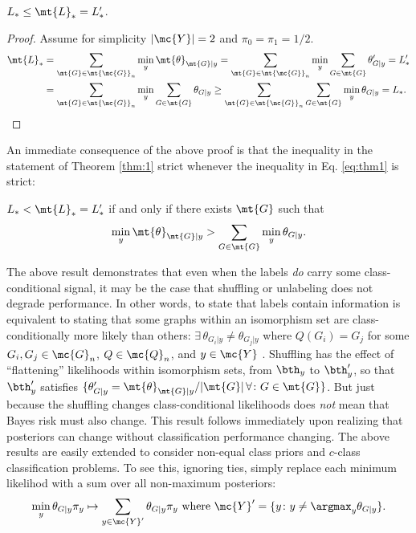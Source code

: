 \documentclass[10pt,journal,cspaper,compsoc]{IEEEtran}
\newcommand{\Qs}{Q}
\begin{document}
\begin{thm} \label{thm:1}
$L_* \leq \mt{L}_*=L_*'$.
\end{thm}

\begin{proof}
	Assume for simplicity $|\mc{Y}|=2$ and $\pi_0=\pi_1=1/2$.  
\begin{align} \label{eq:thm1}
	\mt{L}_*&=\sum_{\mt{G} \in \mt{\mc{G}}_n} \min_y  \mt{\theta}_{\mt{G}|y}  
	=\sum_{\mt{G} \in \mt{\mc{G}}_n} \min_y  \sum_{G \in \mt{G}}\theta_{G|y}'  = L_*' \nonumber \\
	&=\sum_{\mt{G} \in \mt{\mc{G}}_n} \min_y  \sum_{G \in \mt{G}}\theta_{G|y} 
	 \geq \sum_{\mt{G} \in \mt{\mc{G}}_n} \sum_{G \in \mt{G}} \min_y  \theta_{G|y}  = L_*.
\end{align}
\end{proof}



An immediate consequence of the above proof is that the inequality in the statement of Theorem \ref{thm:1} strict whenever the inequality in Eq. \eqref{eq:thm1} is strict:

\begin{thm} \label{thm:2}
	$L_* < \mt{L}_*=L'_*$ if and only if there exists $\mt{G}$ such that
	$$\min_y \mt{\theta}_{\mt{G}|y} > \sum_{G \in \mt{G}}\min_y \theta_{G|y}.$$
\end{thm}
The above result demonstrates that even when the labels \emph{do} carry some class-conditional signal, it may be the case that shuffling or unlabeling does not degrade performance.  In other words, to state that labels contain information is equivalent to stating that some graphs within an isomorphism set are class-conditionally more likely than others: $\exists \, \theta_{G_i|y} \neq \theta_{G_j|y}$ where $\Qs(G_i)=G_j$ for some $G_i,G_j \in \mc{G}_n$, $\Qs \in \mc{Q}_n$, and $y \in \mc{Y}$%
.  Shuffling has the effect of ``flattening'' likelihoods within isomorphism sets, from $\bth_y$ to $\bth_y'$, so that $\bth_y'$ satisfies $\{\theta_{G|y}'=\mt{\theta}_{\mt{G}|y}/|\mt{G}| \, \forall \colon G \in \mt{G}\}$.  But just because the shuffling changes class-conditional likelihoods does \emph{not} mean that Bayes risk must also change. This result follows immediately upon realizing that posteriors can change without classification performance changing.  The above results are easily extended to consider non-equal class priors and $c$-class classification problems.  To see this, ignoring ties, simply replace each minimum likelihod with a sum over all non-maximum posteriors: 
$$\min_y \theta_{G|y} \pi_y \mapsto \sum_{y \in \mc{Y}'} \theta_{G|y} \pi_y \text{ where } \mc{Y}' =\{y \colon y \neq \argmax_y \theta_{G|y}\}.$$
\end{document}
